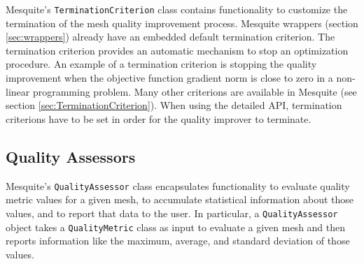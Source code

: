 Mesquite's \texttt{TerminationCriterion} class contains functionality
to customize the termination of the mesh quality improvement process. 
Mesquite wrappers (section \ref{sec:wrappers}) already have an embedded default termination
criterion. The termination criterion provides an automatic mechanism to stop an optimization
procedure. An example of a termination criterion is stopping the quality
improvement when the objective function gradient norm is close
to zero in a non-linear programming problem. Many other criterions are available in Mesquite (see
section \ref{sec:TerminationCriterion}). When using the detailed API, termination criterions have to
be set in order for the quality improver to terminate. 
 

\subsection{Quality Assessors}

Mesquite's \texttt{QualityAssessor} class encapsulates functionality to
evaluate quality metric values for a given mesh, to accumulate
statistical information about those values, and to report that data to
the user.  In particular, a \texttt{QualityAssessor} object takes a
{\tt QualityMetric} class as input to evaluate a given mesh and then
reports information like the maximum, average, and standard deviation
of those values.


